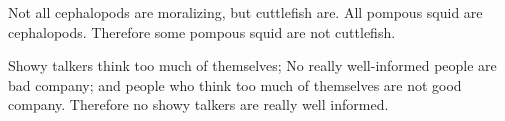 {\begin{exercises}


\item Not all cephalopods are moralizing, but cuttlefish are. All pompous squid are cephalopods. Therefore some pompous squid are not cuttlefish. 

%



\item \label{itm:talkers} Showy talkers think too much of themselves; No really well-informed people are bad company; and people who think too much of themselves are not good company. Therefore no showy talkers are really well informed. %





\end{exercises}}
